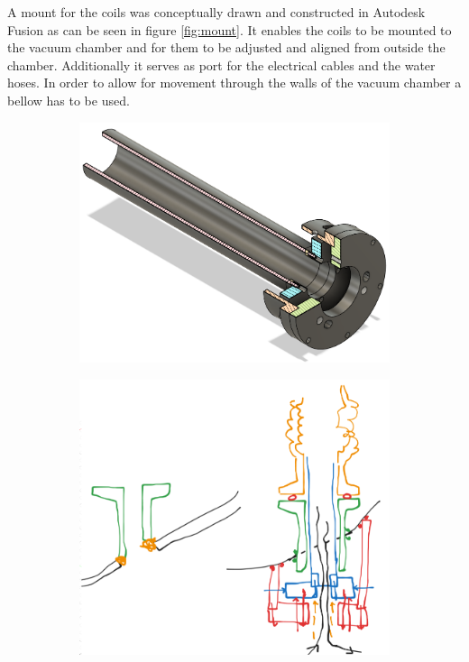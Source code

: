 A mount for the coils was conceptually drawn and constructed in Autodesk Fusion as can be seen in figure \ref{fig:mount}.
It enables the coils to be mounted to the vacuum chamber and for them to be adjusted and aligned from outside the chamber.
Additionally it serves as port for the electrical cables and the water hoses.
In order to allow for movement through the walls of the vacuum chamber a bellow has to be used.
\begin{figure}[H]
    \begin{subfigure}[b]{0.5\textwidth}
        \centering
        \includegraphics[width=\textwidth]{Images/02_Coils/Coil_mount_crosssection.png}
        \label{fig:Coil mount crosssection}
    \end{subfigure}
    \hfill
    \begin{subfigure}[b]{0.5\textwidth}
        \centering
        \includegraphics[width=\textwidth]{Images/02_Coils/coil_mount.png}

\end{subfigure}
\end{figure}
